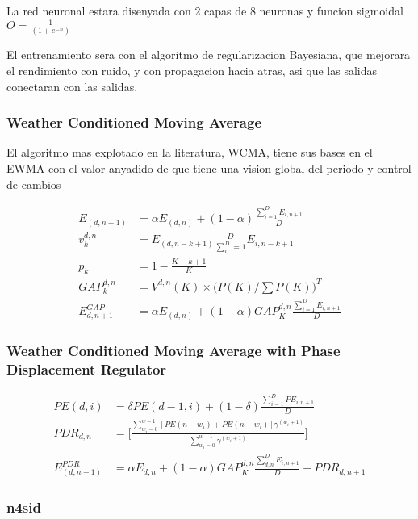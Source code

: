 La red neuronal estara disenyada con 2 capas de 8 neuronas y funcion sigmoidal $O = \frac{1}{(1+e^{-n})}$

El entrenamiento sera con el algoritmo de regularizacion Bayesiana, que mejorara el rendimiento con ruido, y con propagacion hacia atras, asi que las salidas conectaran con las salidas.




\subsubsection{ Weather Conditioned Moving Average} 
\label{ssub:subsubsection_name}

El algoritmo mas explotado en la literatura, WCMA, tiene sus bases en el EWMA con el valor anyadido de que tiene una vision global del periodo y control de cambios 

\begin{align}
	E_{(d,n+1)} &= \alpha E_{(d,n)} + (1-\alpha) \frac  {\sum_{i=1}^D E_{i,n+1}} {D} \\
	v^{d,n}_k &= E_{(d,n-k+1)} \frac {D}{\sum^D_i=1} E_{i,n-k+1} \\
	p_k &= 1-\frac {K-k+1}{K} \\
	GAP_k^{d,n} &= V^{d,n}(K) \times \big(P(K) / \sum P(K) \big)^T \\
	E^{GAP}_{d,n+1} &= \alpha E_(d,n) + (1-\alpha) GAP_K^{d,n} \frac{\sum^D_{i=1} E_{i,n+1}}{D}
\end{align}



\subsubsection{ Weather Conditioned Moving Average with Phase Displacement Regulator} 
\label{ssub:subsubsection_name}


\begin{align}
	PE(d,i) &= \delta PE(d-1,i) + (1-\delta) \frac  {\sum_{i=1}^D PE_{i,n+1}} {D} \\
	PDR_{d,n} &= \bigg[ \frac{\sum^{w-1}_{w_i = 0} [ PE(n-w_i) + PE(n+w_i) ] \gamma^{(w_i + 1)}}{\sum_{w_i = 0}^{w - 1} \gamma^{(w_i + 1)}} \bigg] \\
	E^{PDR}_(d,n+1) &= \alpha E_{d,n} + (1-\alpha ) GAP^{d,n}_K \frac{\sum^D_{d,n} E_{i,n+1} }{D} + PDR_{d,n+1}
\end{align}


\subsubsection{n4sid}
\label{ssub:n4sid}

